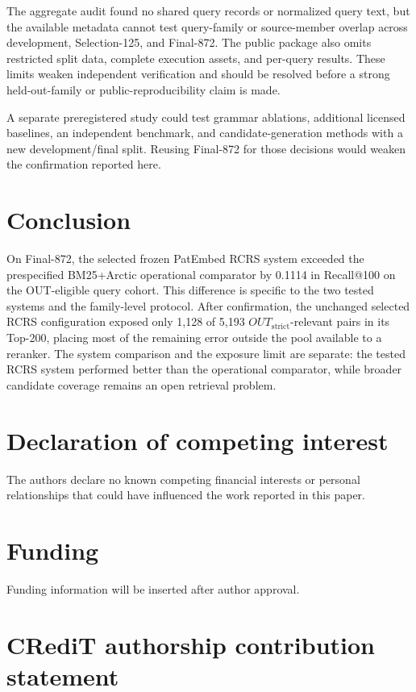 \documentclass[final,5p,times,twocolumn]{elsarticle}
\begin{document}
The aggregate audit found no shared query records or normalized query text,
but the available metadata cannot test query-family or source-member overlap
across development, Selection-125, and Final-872. The public package also omits
restricted split data, complete execution assets, and per-query results.
These limits weaken independent verification and should be resolved before a
strong held-out-family or public-reproducibility claim is made.

A separate preregistered study could test grammar ablations, additional licensed
baselines, an independent benchmark, and candidate-generation methods with a
new development/final split. Reusing Final-872 for those decisions would weaken the
confirmation reported here.

\section{Conclusion}

On Final-872, the selected frozen PatEmbed RCRS system exceeded the
prespecified BM25+Arctic operational comparator by 0.1114 in Recall@100 on the
OUT-eligible query cohort. This difference is specific to the two
tested systems and the family-level protocol. After confirmation,
the unchanged selected RCRS configuration exposed only 1,128 of 5,193
\(OUT_{\mathrm{strict}}\)-relevant pairs in
its Top-200, placing most of the remaining error outside the pool available to
a reranker. The system comparison and the exposure limit are separate: the
tested RCRS system performed better than the operational comparator, while broader candidate
coverage remains an open retrieval problem.

\section*{Declaration of competing interest}

The authors declare no known competing financial interests or personal
relationships that could have influenced the work reported in this paper.

\section*{Funding}

Funding information will be inserted after author approval.

\section*{CRediT authorship contribution statement}
\end{document}
